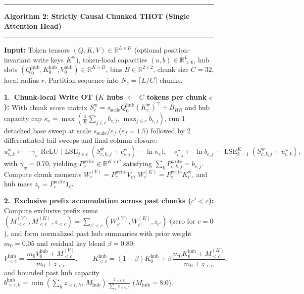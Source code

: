 \documentclass[11pt]{article}
\newcommand{\one}{\mathbf{1}}
\newcommand{\ReLU}{\operatorname{ReLU}}
\begin{document}
\begin{figure}[t]
  \centering
  \rule{\linewidth}{0.8pt}
  \vspace{-0.35em}
  \begin{flushleft}
  \small
  \hypertarget{alg:causal-thot}{\textbf{Algorithm 2: Strictly Causal Chunked THOT (Single Attention Head)}}
  \end{flushleft}
  \vspace{-0.45em}
  \rule{\linewidth}{0.4pt}
  \begin{minipage}{\linewidth}
  \small
  \setlength{\parskip}{0.25em}
  \textbf{Input:} Token tensors $(Q, K, V) \in \mathbb{R}^{L \times D}$ (optional position-invariant write keys $K^{\text{w}}$), token-local capacities $(a, b) \in \mathbb{R}_{>0}^L$, hub slots $(Q^{\text{hub}}_0, K^{\text{hub}}_0, V^{\text{hub}}_0) \in \mathbb{R}^{K \times D}$, bias $B \in \mathbb{R}^{2\times 2}$, chunk size $C=32$, local radius $r$. Partition sequence into $N_c = \lceil L/C \rceil$ chunks.

  \textbf{1.\ Chunk-local Write OT ($K$ hubs $\leftarrow$ $C$ tokens per chunk $c$):}
  With chunk score matrix $S^{\text{w}}_c = s_{\text{scale}} Q^{\text{hub}}_0 (K^{\text{w}}_c)^\top + B_{HR}$ and hub capacity cap $\kappa_c = \max(\frac{1}{K}\sum_{j\in c} b_{c,j},\, \max_{j\in c} b_{c,j})$, run 1 detached base sweep at scale $s_{\text{scale}}/\varepsilon_f$ ($\varepsilon_f=1.5$) followed by 2 differentiated tail sweeps and final column closure:
  \[
    u^{\text{w}}_{c,k} \leftarrow -\gamma_w \ReLU\!\big(\operatorname{LSE}_{j \in c}(S^{\text{w}}_{c,k,j} + v^{\text{w}}_{c,j}) - \ln \kappa_c\big),\quad
    v^{\text{w}}_{c,j} \leftarrow \ln b_{c,j} - \operatorname{LSE}_{k=1}^{K}(S^{\text{w}}_{c,k,j} + u^{\text{w}}_{c,k}),
  \]
  with $\gamma_w = 0.70$, yielding $P^{\text{write}}_c \in \mathbb{R}^{K\times C}$ satisfying $\sum_k P^{\text{write}}_{c,k,j} = b_{c,j}$. Compute chunk moments $W^{(V)}_c = P^{\text{write}}_c V_c$, $W^{(K)}_c = P^{\text{write}}_c K^{\text{w}}_c$, and hub mass $z_c = P^{\text{write}}_c \one_C$.

  \textbf{2.\ Exclusive prefix accumulation across past chunks ($c' < c$):}
  Compute exclusive prefix sums $(M^{(V)}_{<c}, M^{(K)}_{<c}, z_{<c}) = \sum_{c' < c} (W^{(V)}_{c'}, W^{(K)}_{c'}, z_{c'})$ (zero for $c=0$), and form normalized past hub summaries with prior weight $m_0 = 0.05$ and residual key blend $\beta = 0.80$:
  \[
    V^{\text{hub}}_{<c} = \frac{m_0 V^{\text{hub}}_0 + M^{(V)}_{<c}}{m_0 + z_{<c}}, \qquad
    K^{\text{hub}}_{<c} = (1-\beta) K^{\text{hub}}_0 + \beta\,\frac{m_0 K^{\text{hub}}_0 + M^{(K)}_{<c}}{m_0 + z_{<c}},
  \]
  and bounded past hub capacity $b^{\text{hub}}_{<c,k} = \min(\sum_h z_{<c,h},\, M_{\text{hub}})\,\frac{z_{<c,k}}{\sum_h z_{<c,h}}$ ($M_{\text{hub}}=8.0$).


\end{minipage}
\end{figure}
\end{document}
